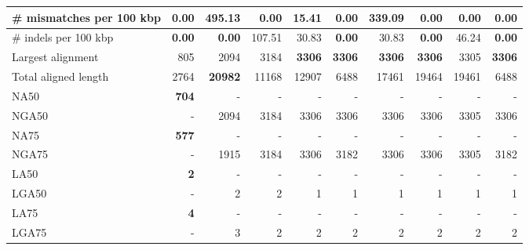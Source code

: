 \documentclass[12pt,a4paper]{article}
\begin{document}
\begin{table}[ht]
\begin{center}
\begin{tabular}{|l*{9}{|r}|}
\# mismatches per 100 kbp & {\bf 0.00} & 495.13 & {\bf 0.00} & 15.41 & {\bf 0.00} & 339.09 & {\bf 0.00} & {\bf 0.00} & {\bf 0.00} \\ \hline
\# indels per 100 kbp & {\bf 0.00} & {\bf 0.00} & 107.51 & 30.83 & {\bf 0.00} & 30.83 & {\bf 0.00} & 46.24 & {\bf 0.00} \\ \hline
Largest alignment & 805 & 2094 & 3184 & {\bf 3306} & {\bf 3306} & {\bf 3306} & {\bf 3306} & 3305 & {\bf 3306} \\ \hline
Total aligned length & 2764 & {\bf 20982} & 11168 & 12907 & 6488 & 17461 & 19464 & 19461 & 6488 \\ \hline
NA50 & {\bf 704} & - & - & - & - & - & - & - & - \\ \hline
NGA50 & - & 2094 & 3184 & 3306 & 3306 & 3306 & 3306 & 3305 & 3306 \\ \hline
NA75 & {\bf 577} & - & - & - & - & - & - & - & - \\ \hline
NGA75 & - & 1915 & 3184 & 3306 & 3182 & 3306 & 3306 & 3305 & 3182 \\ \hline
LA50 & {\bf 2} & - & - & - & - & - & - & - & - \\ \hline
LGA50 & - & 2 & 2 & 1 & 1 & 1 & 1 & 1 & 1 \\ \hline
LA75 & {\bf 4} & - & - & - & - & - & - & - & - \\ \hline
LGA75 & - & 3 & 2 & 2 & 2 & 2 & 2 & 2 & 2 \\ \hline
\end{tabular}
\end{center}
\end{table}
\end{document}
